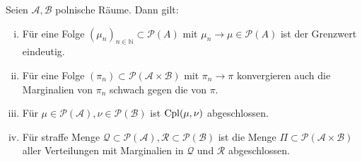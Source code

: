 \begin{lemma}\label{thm:closed_couplings}
Seien $\mathcal{A,B}$ polnische Räume. Dann gilt: 
\begin{enumerate}[(i)]
    \item Für eine Folge $(\mu_n)_{n\in \mathbb{N}} \subset\mathcal{P}(A)$ mit $\mu_n \rightarrow \mu \in \mathcal{P}(A)$ ist der Grenzwert eindeutig.
    \item Für eine Folge $(\pi_n) \subset \mathcal{P}(\mathcal{A} \times \mathcal{B})$ mit $\pi_n \rightarrow \pi$ konvergieren auch die Marginalien von $\pi_n$ schwach gegen die von $\pi$. 
    \item Für $\mu \in \mathcal{P}(\mathcal{A}), \nu \in \mathcal{P}(\mathcal{B})$ ist $\operatorname{Cpl}(\mu, \nu)$ abgeschlossen.
    \item Für straffe Menge $\mathcal{Q}\subset \mathcal{P}(\mathcal{A}), \mathcal{R}\subset \mathcal{P}(\mathcal{B})$ ist die Menge $\Pi\subset \mathcal{P}(\mathcal{A}\times\mathcal{B})$ aller Verteilungen mit Marginalien in $\mathcal{Q}$ und $\mathcal{R}$ abgeschlossen.
\end{enumerate}
\end{lemma}
